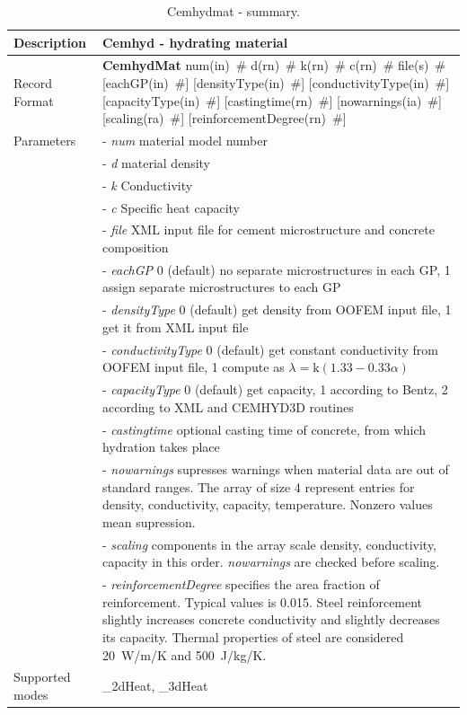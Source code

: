\documentclass[a4paper]{article}
\newcommand{\descitem}[1]{{\noindent \bf #1}}
\newcommand{\elemparam}[2]{{{#1\tiny (#2)}~\#}}
\newcommand{\param}[1]{{\it #1}}
\begin{document}
\begin{table}[!htb]
\begin{tabular}{|l|p{9cm}|}
\hline
Description & Cemhyd - hydrating material\\
\hline
Record Format & \descitem{CemhydMat} \elemparam{num}{in} \elemparam{d}{rn} \elemparam{k}{rn} \elemparam{c}{rn} \elemparam{file}{s} [\elemparam{eachGP}{in}] [\elemparam{densityType}{in}] [\elemparam{conductivityType}{in}] [\elemparam{capacityType}{in}] [\elemparam{castingtime}{rn}] [\elemparam{nowarnings}{ia}] [\elemparam{scaling}{ra}] [\elemparam{reinforcementDegree}{rn}]\\
Parameters &- \param{num} material model number\\
&- \param{d} material density\\
&- \param{k} Conductivity\\
&- \param{c} Specific heat capacity\\
&- \param{file} XML input file for cement microstructure and concrete composition\\
&- \param{eachGP} 0 (default) no separate microstructures in each GP, 1 assign separate microstructures to each GP\\
&- \param{densityType} 0 (default) get density from OOFEM input file, 1 get it from XML input file\\
&- \param{conductivityType} 0 (default) get constant conductivity from OOFEM input file, 1 compute as $\lambda = \textrm{k} (1.33-0.33\alpha)$ \cite{Ruiz:01}\\
&- \param{capacityType} 0 (default) get capacity, 1 according to Bentz, 2 according to XML and CEMHYD3D routines\\
&- \param{castingtime} optional casting time of concrete, from which hydration takes place\\
&- \param{nowarnings} supresses warnings when material data are out of standard ranges. The array of size 4 represent entries for density, conductivity, capacity, temperature. Nonzero values mean supression.\\
&- \param{scaling} components in the array scale density, conductivity, capacity in this order. \param{nowarnings} are checked before scaling.\\
&- \param{reinforcementDegree} specifies the area fraction of reinforcement. Typical values is 0.015. Steel reinforcement slightly increases concrete conductivity and slightly decreases its capacity. Thermal properties of steel are considered 20~W/m/K and 500~J/kg/K.\\
Supported modes& \_2dHeat, \_3dHeat\\
\hline
\end{tabular}
\caption{Cemhydmat - summary.}
\label{Cemhydmat_table}
\end{table}
\end{document}
